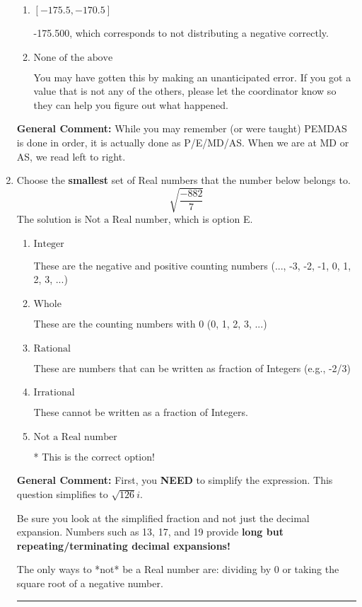 \documentclass{extbook}[14pt]
\newcommand{\litem}[1]{\item #1

\rule{\textwidth}{0.4pt}}
\begin{document}
\begin{enumerate}
{\begin{enumerate}[label=\Alph*.]
 -88.083, which corresponds to an Order of Operations error: not reading left-to-right for multiplication/division.
\item \( [-175.5, -170.5] \)

 -175.500, which corresponds to not distributing a negative correctly.
\item \( \text{None of the above} \)

 You may have gotten this by making an unanticipated error. If you got a value that is not any of the others, please let the coordinator know so they can help you figure out what happened.
\end{enumerate}

\textbf{General Comment:} While you may remember (or were taught) PEMDAS is done in order, it is actually done as P/E/MD/AS. When we are at MD or AS, we read left to right.
}
\litem{
Choose the \textbf{smallest} set of Real numbers that the number below belongs to.
\[ \sqrt{\frac{-882}{7}} \]
The solution is \( \text{Not a Real number} \), which is option E.\begin{enumerate}[label=\Alph*.]
\item \( \text{Integer} \)

These are the negative and positive counting numbers (..., -3, -2, -1, 0, 1, 2, 3, ...)
\item \( \text{Whole} \)

These are the counting numbers with 0 (0, 1, 2, 3, ...)
\item \( \text{Rational} \)

These are numbers that can be written as fraction of Integers (e.g., -2/3)
\item \( \text{Irrational} \)

These cannot be written as a fraction of Integers.
\item \( \text{Not a Real number} \)

* This is the correct option!
\end{enumerate}

\textbf{General Comment:} First, you \textbf{NEED} to simplify the expression. This question simplifies to $\sqrt{126} i$. 
 
 Be sure you look at the simplified fraction and not just the decimal expansion. Numbers such as 13, 17, and 19 provide \textbf{long but repeating/terminating decimal expansions!} 
 
 The only ways to *not* be a Real number are: dividing by 0 or taking the square root of a negative number. 
 
}
\end{enumerate}
\end{document}
